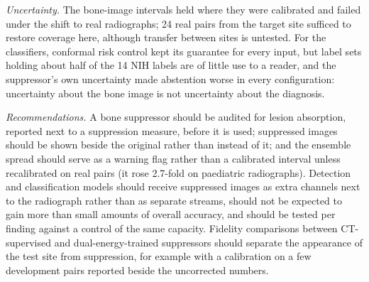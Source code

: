 \emph{Uncertainty.} The bone-image intervals held where they were calibrated and failed under the shift to real radiographs; 24 real pairs
from the target site sufficed to restore coverage here, although transfer between sites is untested. For the classifiers, conformal risk
control kept its guarantee for every input, but label sets holding about half of the 14 NIH labels are of little use to a reader, and the
suppressor's own uncertainty made abstention worse in every configuration: uncertainty about the bone image is not uncertainty about the
diagnosis.

\emph{Recommendations.} A bone suppressor should be audited for lesion absorption, reported next to a suppression measure, before it is
used; suppressed images should be shown beside the original rather than instead of it; and the ensemble spread should serve as a warning
flag rather than a calibrated interval unless recalibrated on real pairs (it rose 2.7-fold on paediatric radiographs). Detection and
classification models should receive suppressed images as extra channels next to the radiograph rather than as separate streams, should
not be expected to gain more than small amounts of overall accuracy, and should be tested per finding against a control of the same
capacity. Fidelity comparisons between CT-supervised and dual-energy-trained suppressors should separate the appearance of the test site
from suppression, for example with a calibration on a few development pairs reported beside the uncorrected numbers.

